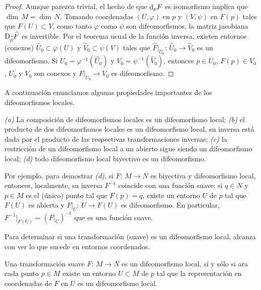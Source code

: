 \begin{proof}
	Aunque parezca trivial, el hecho de que $\diferencial[p]{F}$ es
	isomorfismo implica que $\dim\,M=\dim\,N$. Tomando coordenadas
	$(U,\varphi)$ en $p$ y $(V,\psi)$ en $F(p)$ tales que
	$F(U)\subset V$, como tanto $\varphi$ como $\psi$ son
	difeomorfismos, la matriz jacobiana
	$\jacobiana[\widehat{p}]{\widehat{F}}$ es invertible. Por el teorema
	usual de la funci\'{o}n inversa, existen entornos (conexos)
	$\widehat{U}_{0}\subset\varphi(U)$ y $\widehat{V}_{0}\subset\psi(V)$
	tales que $\widehat{F}|_{\widehat{U}_{0}}:\,%
	\widehat{U}_{0}\rightarrow\widehat{V}_{0}$ es un difeomorfismo. Si
	$U_{0}=\varphi^{-1}(\widehat{U}_{0})$ y
	$V_{0}=\psi^{-1}(\widehat{V}_{0})$, entonces $p\in U_{0}$,
	$F(p)\in V_{0}$, $U_{0}$ y $V_{0}$ son conexos y
	$F|_{U_{0}}\rightarrow V_{0}$ es difeomorfismo.
\end{proof}

A continuaci\'{o}n enunciamos algunas propiedades importantes de los
difeomorfismos locales.

\begin{propoDifeoLocal}\label{thm:propisdifeoslocales}
	\emph{(a)} La composici\'{o}n de difeomorfismos locales es un
	difeomorfismo local; \emph{(b)} el producto de dos difeomorfismos
	locales es un difeomorfismo local, su inversa est\'{a} dada por el
	producto de las respectivas transformaciones inversas;
	\emph{(c)} la restricci\'{o}n de un difeomorfismo local a un
	abierto sigue siendo un difeomorfismo local; \emph{(d)} todo
	difeomorfismo local biyectivo es un difeomorfismo.
\end{propoDifeoLocal}

Por ejemplo, para demostrar \emph{(d)}, si $F:\,M\rightarrow N$ es
biyectiva y difeomorfismo local, entonces, localmente, su inversa
$F^{-1}$ coincide con una funci\'{o}n suave: si $q\in N$ y $p\in M$
es el (\'{u}nico) punto tal que $F(p)=q$, existe un entorno $U$ de $p$
tal que $F(U)$ es abierta y $F|_{U}:\,U\rightarrow F(U)$ es difeomorfismo.
En particular, $F^{-1}|_{F(U)}=(F|_{U})^{-1}$ que es una funci\'{o}n
suave.

Para determinar si una transformaci\'{o}n (suave) es un difeomorfismo local,
alcanza con ver lo que sucede en entornos coordenados.

\begin{obsDifeoLocal}\label{obs:difeoslocaleslocal}
	Una transformaci\'{o}n suave $F:\,M\rightarrow N$ es un
	difeomorfismo local, si y s\'{o}lo si ara cada punto $p\in M$
	existe un entorno $U\subset M$ de $p$ tal que la representaci\'{o}n
	en coordenadas de $F$ en $U$ es un difeomorfismo local.
\end{obsDifeoLocal}

